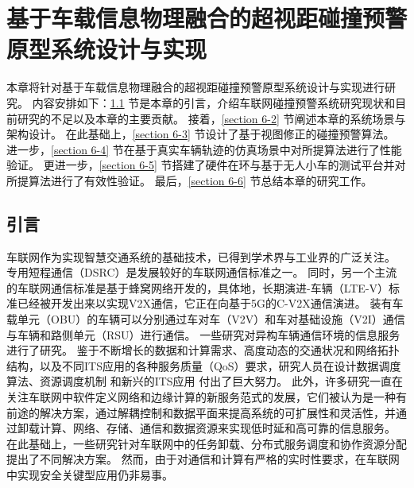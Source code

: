 \chapter{基于车载信息物理融合的超视距碰撞预警原型系统设计与实现}
本章将针对基于车载信息物理融合的超视距碰撞预警原型系统设计与实现进行研究。
内容安排如下：\ref{section 6-1} 节是本章的引言，介绍车联网碰撞预警系统研究现状和目前研究的不足以及本章的主要贡献。
接着，\ref{section 6-2} 节阐述本章的系统场景与架构设计。
在此基础上，\ref{section 6-3} 节设计了基于视图修正的碰撞预警算法。
进一步，\ref{section 6-4} 节在基于真实车辆轨迹的仿真场景中对所提算法进行了性能验证。
更进一步，\ref{section 6-5} 节搭建了硬件在环与基于无人小车的测试平台并对所提算法进行了有效性验证。
最后，\ref{section 6-6} 节总结本章的研究工作。

\section{引言}\label{section 6-1}

车联网作为实现智慧交通系统的基础技术，已得到学术界与工业界的广泛关注。
专用短程通信（DSRC）\cite{kenney2011dedicated}是发展较好的车联网通信标准之一。
同时，另一个主流的车联网通信标准是基于蜂窝网络\cite{agiwal2016next}开发的，具体地，长期演进-车辆（LTE-V）标准已经被开发出来以实现V2X通信，它正在向基于5G的C-V2X通信演进\cite{araniti2013lte}。
装有车载单元（OBU）的车辆可以分别通过车对车（V2V）和车对基础设施（V2I）通信与车辆和路侧单元（RSU）进行通信。
一些研究\cite{ucar2015multihop, dai2018bandwidth, ahmed2018cooperative}对异构车辆通信环境的信息服务进行了研究。
鉴于不断增长的数据和计算需求\cite{zhai2018optimization}、高度动态的交通状况和网络拓扑结构\cite{zhai2019fast}，以及不同ITS应用的各种服务质量（QoS）要求\cite{babbar2022lbsmt}，研究人员在设计数据调度算法\cite{liu2016cooperative, dai2016adaptive, wang2017dynamic}、资源调度机制 \cite{peng2017resource, ahmed2018secure}和新兴的ITS应用 \cite{liu2013improving, dai2016quality}付出了巨大努力。
此外，许多研究一直在关注车联网中软件定义网络\cite{liu2016cooperative, wang2019delay, liu2018coding}和边缘计算\cite{hou2016vehicular, wang2018offloading}的新服务范式的发展，它们被认为是一种有前途的解决方案，通过解耦控制和数据平面来提高系统的可扩展性和灵活性，并通过卸载计算、网络、存储、通信和数据资源来实现低时延和高可靠的信息服务。
在此基础上，一些研究针对车联网中的任务卸载\cite{wang2019delay}、分布式服务调度\cite{sun2018cooperative}和协作资源分配\cite{zhou2019computation}提出了不同解决方案。
然而，由于对通信和计算有严格的实时性要求，在车联网中实现安全关键型应用仍非易事。

